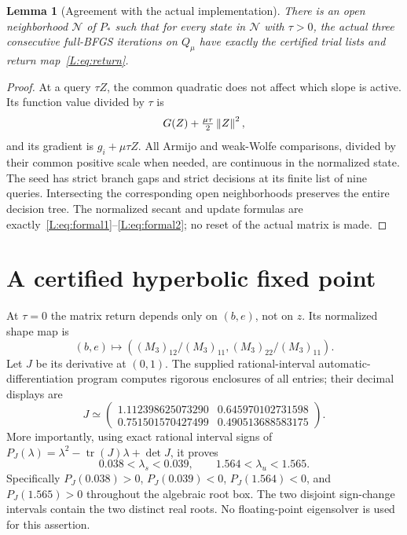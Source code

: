 \documentclass[10pt,oneside,openany]{book}
\newtheorem{lemma}{Lemma}[chapter]
\theoremstyle{remark}\newtheorem{remark}{Remark}[chapter]
\begin{document}
\begin{lemma}[Agreement with the actual implementation]\label{L:lem:agreement}
There is an open neighborhood $\mathcal N$ of $P_*$ such that for every state in $\mathcal N$ with $\tau>0$, the actual three consecutive full-BFGS iterations on $Q_\mu$ have exactly the certified trial lists and return map~\eqref{L:eq:return}.
\end{lemma}
\begin{proof}
At a query $\tau Z$, the common quadratic does not affect which slope is active. Its function value divided by $\tau$ is
\[
 G(Z)+\tfrac{\mu\tau}{2}\left\lVert Z\right\rVert^2,
\]
and its gradient is $g_i+\mu\tau Z$. All Armijo and weak-Wolfe comparisons, divided by their common positive scale when needed, are continuous in the normalized state. The seed has strict branch gaps and strict decisions at its finite list of nine queries. Intersecting the corresponding open neighborhoods preserves the entire decision tree. The normalized secant and update formulas are exactly~\eqref{L:eq:formal1}--\eqref{L:eq:formal2}; no reset of the actual matrix is made.
\end{proof}


\setcounter{section}{3}
\setcounter{theorem}{2}
\setcounter{lemma}{1}
\setcounter{corollary}{0}
\setcounter{proposition}{0}
\setcounter{remark}{0}
\setcounter{equation}{2}
\section{A certified hyperbolic fixed point}
At $\tau=0$ the matrix return depends only on $(b,e)$, not on $z$. Its normalized shape map is
\[
 (b,e)\longmapsto ((M_3)_{12}/(M_3)_{11},(M_3)_{22}/(M_3)_{11}).
\]
Let $J$ be its derivative at $(0,1)$. The supplied rational-interval automatic-differentiation program computes rigorous enclosures of all entries; their decimal displays are
\[
 J\simeq\begin{pmatrix}
 1.112398625073290&0.645970102731598\\
 0.751501570427499&0.490513688583175
 \end{pmatrix}.
\]
More importantly, using exact rational interval signs of
$P_J(\lambda)=\lambda^2-\operatorname{tr}(J)\lambda+\det J$, it proves
\begin{equation}\label{L:eq:eigshape}
 0.038<\lambda_s<0.039,\qquad 1.564<\lambda_u<1.565.
\end{equation}
Specifically $P_J(0.038)>0$, $P_J(0.039)<0$, $P_J(1.564)<0$, and $P_J(1.565)>0$ throughout the algebraic root box. The two disjoint sign-change intervals contain the two distinct real roots. No floating-point eigensolver is used for this assertion.
\end{document}
